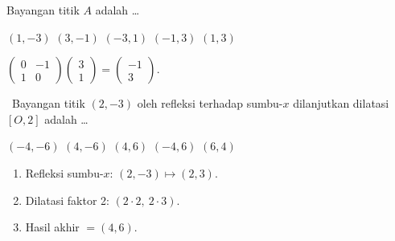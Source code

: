 \documentclass[11pt,a4paper]{exam}
\newenvironment{langkah}{%
  \begin{enumerate}[label=\textbf{Langkah \arabic*:},leftmargin=2.6em,
    itemsep=2pt,topsep=2pt]}{\end{enumerate}}
\newcommand{\Adv}{{\footnotesize\textsf{\textcolor{oranye}{[Advanced]}}}\ }
\begin{document}
\begin{questions}
Bayangan titik $A$ adalah \dots
\begin{choices}
\choice $(1,-3)$ \choice $(3,-1)$ \choice $(-3,1)$ \CorrectChoice $(-1,3)$ \choice $(1,3)$
\end{choices}
\begin{solution}$\begin{pmatrix} 0 & -1\\ 1 & 0 \end{pmatrix}\begin{pmatrix} 3\\ 1 \end{pmatrix}
= \begin{pmatrix} -1\\ 3 \end{pmatrix}.$\end{solution}

\question \Adv Bayangan titik $(2,-3)$ oleh refleksi terhadap sumbu-$x$ dilanjutkan
dilatasi $[O,2]$ adalah \dots
\begin{choices}
\choice $(-4,-6)$ \choice $(4,-6)$ \CorrectChoice $(4,6)$ \choice $(-4,6)$ \choice $(6,4)$
\end{choices}
\begin{solution}
\begin{langkah}
\item Refleksi sumbu-$x$: $(2,-3) \mapsto (2,3)$.
\item Dilatasi faktor 2: $(2\cdot 2,\ 2\cdot 3)$.
\item Hasil akhir $= (4,6)$.
\end{langkah}
\end{solution}


\end{questions}
\end{document}
